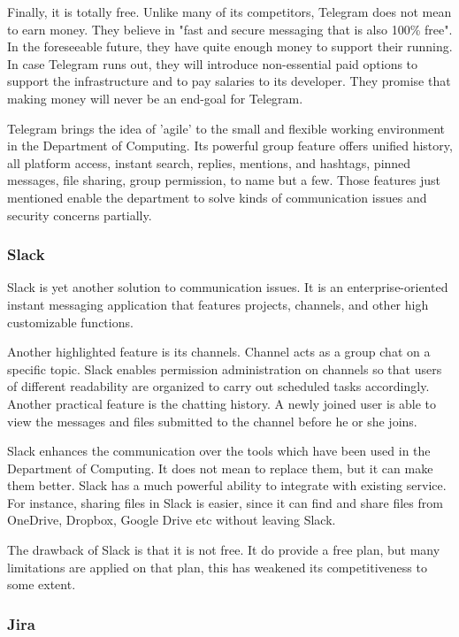 Finally, it is totally free. Unlike many of its competitors, Telegram does not mean to earn money. They believe in "fast and secure messaging that is also 100\% free".  In the foreseeable future, they have quite enough money to support their running. In case Telegram runs out, they will introduce non-essential paid options to support the infrastructure and to pay salaries to its developer. They promise that making money will never be an end-goal for Telegram.

Telegram brings the idea of 'agile' to the small and flexible working environment in the Department of Computing. Its powerful group feature offers unified history, all platform access, instant search, replies, mentions, and hashtags, pinned messages, file sharing, group permission, to name but a few. Those features just mentioned enable the department to solve kinds of communication issues and security concerns partially.

\subsubsection{Slack}
Slack is yet another solution to communication issues. It is an enterprise-oriented instant messaging application that features projects, channels, and other high customizable functions.

Another highlighted feature is its channels. Channel acts as a group chat on a specific topic. Slack enables permission administration on channels so that users of different readability are organized to carry out scheduled tasks accordingly. Another practical feature is the chatting history. A newly joined user is able to view the messages and files submitted to the channel before he or she joins.

Slack enhances the communication over the tools which have been used in the Department of Computing. It does not  mean to replace them,  but it can make them better. Slack has a much powerful ability to integrate with existing service. For instance, sharing files in Slack is easier, since it can find and share files from OneDrive, Dropbox, Google Drive etc without leaving Slack.

The drawback of Slack is that it is not free. It do provide a free plan, but many limitations are applied on that plan, this has weakened its competitiveness to some extent. 

\subsubsection{Jira}

